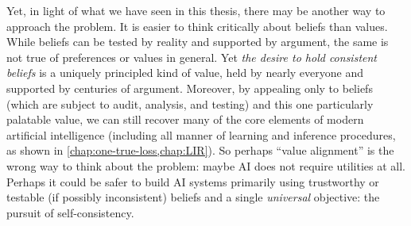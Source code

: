 Yet, in light of what we have seen in this thesis, there may be another way to approach the problem.
It is easier to think critically about beliefs than values.
While beliefs can be 
    tested by reality and supported by argument,
    the same is not true of preferences or values in general. 
Yet \emph{the desire to hold
    consistent beliefs} is a uniquely principled kind of value,
    held by nearly everyone and
    supported by centuries of argument.
%
%
Moreover, by appealing only to beliefs (which are subject to audit, analysis, and testing)
    and this one particularly palatable value, we can still 
    recover many of the core elements of modern artificial intelligence
    (including all manner of learning and inference procedures, as shown in \cref{chap:one-true-loss,chap:LIR}). 
%
%
So perhaps ``value alignment'' is the wrong way to think about the problem: maybe AI does not require
utilities at all.  
Perhaps it could be safer to build AI systems primarily using 
    trustworthy or testable (if possibly inconsistent)
    beliefs and a single \emph{universal} objective: 
    the pursuit of self-consistency.


%



